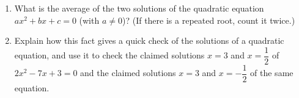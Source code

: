 \begin{enumerate}
\item[(a)] What is the average of the two solutions of the quadratic equation $ax^2+bx+c=0$ (with $a\ne0$)? (If there is a repeated root, count it twice.)
\item[(b)] Explain how this fact gives a quick check of the solutions of a quadratic equation, and use it to check the claimed solutions $x=3$ and $x=\dfrac{1}{2}$ of $2x^2-7x+3=0$ and the claimed solutions $x=3$ and $x=-\dfrac{1}{2}$ of the same equation.
\end{enumerate}
